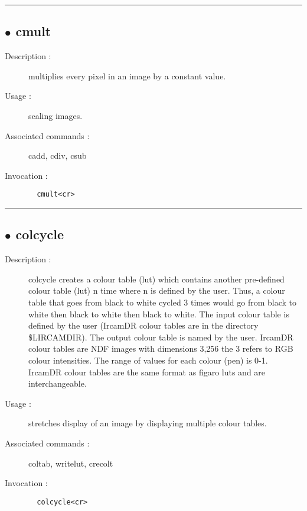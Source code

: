 \hrule \subsection*{$\bullet$ cmult}
\begin{description}
\item[Description :] multiplies every pixel in an image by a constant value.  
\item[Usage :] scaling images.
\item[Associated commands :] cadd, cdiv, csub
\item[Invocation :]

\verb+  cmult<cr> +\end{description}

\hrule \subsection*{$\bullet$ colcycle}
\begin{description}
\item[Description :] colcycle creates a colour table (lut) which contains another
pre-defined colour table (lut) n time where n is defined by the user.
Thus, a colour table that goes from black to white cycled 3 times would
go from black to white then black to white then black to white.  The
input colour table is defined by the user (IrcamDR colour tables are in
the directory \$LIRCAMDIR).  The output colour table is named by the user.
IrcamDR colour tables are NDF images with dimensions 3,256 the 3 refers
to RGB colour intensities.  The range of values for each colour (pen) is
0-1.  IrcamDR colour tables are the same format as figaro luts and are
interchangeable.
\item[Usage :] stretches display of an image by displaying multiple colour
tables.
\item[Associated commands :] coltab, writelut, crecolt
\item[Invocation :]

\verb+  colcycle<cr> +\end{description}

